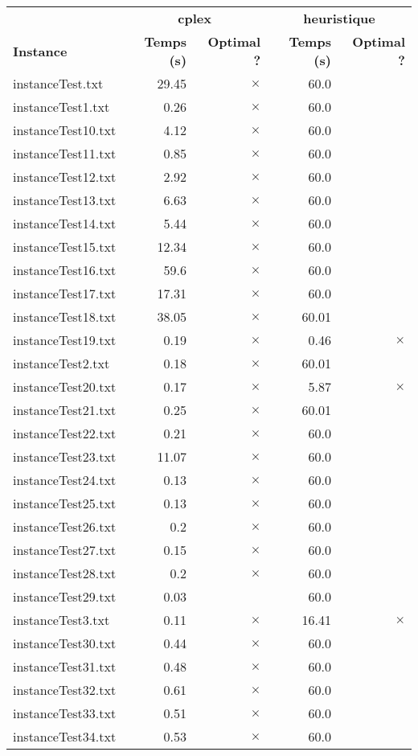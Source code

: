 \documentclass{article}
\begin{document}
\begin{center}
\renewcommand{\arraystretch}{1.4} 
 \begin{tabular}{lrrrr}
	\hline
 & \multicolumn{2}{c}{\textbf{cplex}} & \multicolumn{2}{c}{\textbf{heuristique}}\\
\textbf{Instance}  & \textbf{Temps (s)} & \textbf{Optimal ?}  & \textbf{Temps (s)} & \textbf{Optimal ?} \\\hline

instanceTest.txt & 29.45 & 
$\times$
 & 60.0 & 
\\
instanceTest1.txt & 0.26 & 
$\times$
 & 60.0 & 
\\
instanceTest10.txt & 4.12 & 
$\times$
 & 60.0 & 
\\
instanceTest11.txt & 0.85 & 
$\times$
 & 60.0 & 
\\
instanceTest12.txt & 2.92 & 
$\times$
 & 60.0 & 
\\
instanceTest13.txt & 6.63 & 
$\times$
 & 60.0 & 
\\
instanceTest14.txt & 5.44 & 
$\times$
 & 60.0 & 
\\
instanceTest15.txt & 12.34 & 
$\times$
 & 60.0 & 
\\
instanceTest16.txt & 59.6 & 
$\times$
 & 60.0 & 
\\
instanceTest17.txt & 17.31 & 
$\times$
 & 60.0 & 
\\
instanceTest18.txt & 38.05 & 
$\times$
 & 60.01 & 
\\
instanceTest19.txt & 0.19 & 
$\times$
 & 0.46 & 
$\times$
\\
instanceTest2.txt & 0.18 & 
$\times$
 & 60.01 & 
\\
instanceTest20.txt & 0.17 & 
$\times$
 & 5.87 & 
$\times$
\\
instanceTest21.txt & 0.25 & 
$\times$
 & 60.01 & 
\\
instanceTest22.txt & 0.21 & 
$\times$
 & 60.0 & 
\\
instanceTest23.txt & 11.07 & 
$\times$
 & 60.0 & 
\\
instanceTest24.txt & 0.13 & 
$\times$
 & 60.0 & 
\\
instanceTest25.txt & 0.13 & 
$\times$
 & 60.0 & 
\\
instanceTest26.txt & 0.2 & 
$\times$
 & 60.0 & 
\\
instanceTest27.txt & 0.15 & 
$\times$
 & 60.0 & 
\\
instanceTest28.txt & 0.2 & 
$\times$
 & 60.0 & 
\\
instanceTest29.txt & 0.03 & 
 & 60.0 & 
\\
instanceTest3.txt & 0.11 & 
$\times$
 & 16.41 & 
$\times$
\\
instanceTest30.txt & 0.44 & 
$\times$
 & 60.0 & 
\\
instanceTest31.txt & 0.48 & 
$\times$
 & 60.0 & 
\\
instanceTest32.txt & 0.61 & 
$\times$
 & 60.0 & 
\\
instanceTest33.txt & 0.51 & 
$\times$
 & 60.0 & 
\\
instanceTest34.txt & 0.53 & 
$\times$
 & 60.0 & 
\\
\hline\end{tabular}
\end{center}
\end{document}
